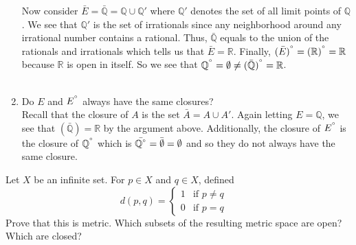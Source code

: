 \documentclass[12pt]{article}
\begin{document}
\begin{enumerate}
Now consider $\bar{E}=\bar{\mathbb{Q}}= \mathbb{Q} \cup \mathbb{Q}'$ where $\mathbb{Q}'$ denotes the set of all limit points of $\mathbb{Q}$. We see that $\mathbb{Q}'$ is the set of irrationals since any neighborhood around any irrational number contains a rational. Thus, $\bar{\mathbb{Q}}$ equals to the union of the rationals and irrationals which tells us that $\bar{E}= \mathbb{R}$. Finally, $(\bar{E})^{\degree} = (\mathbb{R})^{\degree} = \mathbb{R}$ because $\mathbb{R}$ is open in itself. So we see that $\mathbb{Q}^{\degree} = \emptyset  \neq (\bar{\mathbb{Q}})^{\degree} = \mathbb{R}$. \\ \\

\item Do $E$ and $E^{\degree}$ always have the same closures? \\

Recall that the closure of $A$ is the set $\bar{A}= A \cup A'$. Again letting $E = \mathbb{Q}$, we see that $(\bar{\mathbb{Q}})= \mathbb{R}$ by the argument above. Additionally, the closure of $E^{\degree}$ is the closure of $\mathbb{Q}^{\degree}$ which is $\bar{\mathbb{Q}^{\degree}}= \bar{\emptyset}= \emptyset$ and so they do not always have the same closure. \\
\end{enumerate}


\problem Let $X$ be an infinite set. For $p \in X$ and $q \in X$, defined 
\begin{equation*}
d(p,q) = \begin{cases}
             1  & \text{if } p \neq q \\
             0  & \text{if } p=q
       \end{cases} \quad
\end{equation*}
Prove that this is metric. Which subsets of the resulting metric space are open? Which are closed? \\
\end{document}
